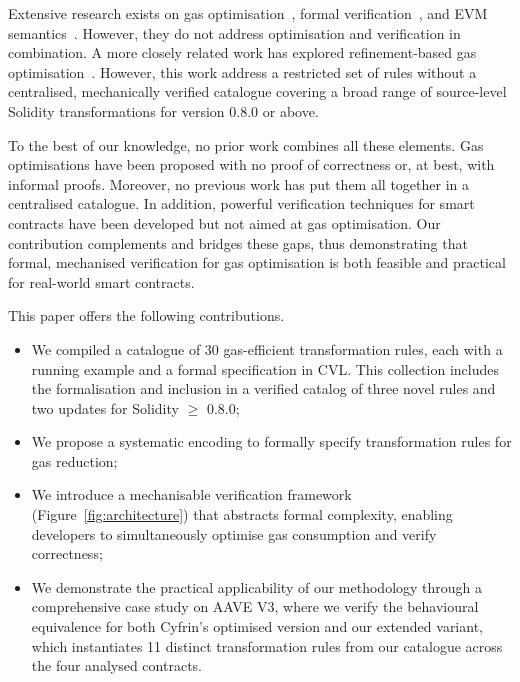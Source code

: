 \documentclass[manuscript,screen,review]{acmart}
\begin{document}
Extensive research exists on gas optimisation~\cite{GASOL,brent2020ethainter,chen2017under,grech2018madmax,khanzadeh2023optimizing,nelaturu2023refinement},
formal verification~\cite{amani2018towards,Beillahi2020,scribble2020,hajdu2019solc,KEVM,hirai2017defining,mueller2018smashing,permenev2020verx,so2020verismart,tsankov2018securify}, and EVM semantics~\cite{albert2018ethir,grech2019gigahorse,grishchenko2018semantic,luu2016making}. However, they do not address optimisation and verification in combination. A more closely related work has explored refinement-based gas optimisation~\cite{NBL21}. However, this work address a restricted set of rules without a centralised, mechanically verified catalogue covering a broad range of source-level Solidity transformations for version 0.8.0 or above. 

To the best of our knowledge, no prior work combines all these elements. Gas optimisations have been proposed with no proof of correctness or, at best, with informal proofs. Moreover, no previous work has put them all together in a centralised catalogue. In addition, powerful verification techniques for smart contracts have been developed but not aimed at gas optimisation. Our contribution complements and bridges these gaps, thus demonstrating that formal, mechanised verification for gas optimisation is both feasible and practical for real-world smart contracts.

This paper offers the following contributions.
\begin{itemize}
\item We compiled a catalogue of 30 gas-efficient transformation rules, each with a running example and a formal specification in CVL. This collection includes the formalisation and inclusion in a verified catalog of three novel rules and two updates for Solidity $\geq$ 0.8.0;
\item We propose a systematic encoding to formally specify transformation rules for gas reduction;
\item We introduce a mechanisable verification framework (Figure~\ref{fig:architecture}) that abstracts formal complexity, enabling developers to simultaneously optimise gas consumption and verify correctness;
\item We demonstrate the practical applicability of our methodology through a comprehensive case study on AAVE V3, where we verify the behavioural equivalence for both Cyfrin's optimised version and our extended variant, which instantiates 11 distinct transformation rules from our catalogue across the four analysed contracts.
\end{itemize}
\end{document}
